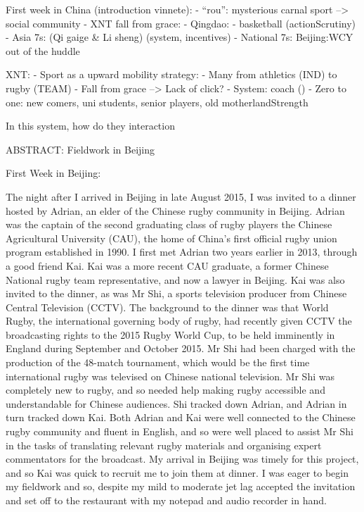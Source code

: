 First week in China (introduction vinnete):
- ``rou'': mysterious carnal sport --> social community
- XNT fall from grace:
- Qingdao:
    - basketball (actionScrutiny)
    - Asia 7s: (Qi gaige & Li sheng) (system, incentives)
    - National 7s: Beijing:WCY out of the huddle


XNT:
- Sport as a upward mobility strategy:
    - Many from athletics (IND) to rugby (TEAM)
- Fall from grace --> Lack of click?
- System: coach ()
- Zero to one: new comers, uni students, senior players, old motherlandStrength

In this system, how do they interaction

ABSTRACT:
Fieldwork in Beijing


First Week in Beijing:

The night after I arrived in Beijing in late August 2015, I was invited to a dinner hosted by Adrian, an elder of the Chinese rugby community in Beijing.  Adrian was the captain of the second graduating class of rugby players the Chinese Agricultural University (CAU), the home of China's first official rugby union program established in 1990.  I first met Adrian two years earlier in 2013, through a good friend Kai. Kai was  a more recent CAU graduate, a former Chinese National rugby team representative, and now a lawyer in Beijing.  Kai was also invited to the dinner, as was Mr Shi, a sports television producer from Chinese Central Television (CCTV).  The background to the dinner was that World Rugby, the international governing body of rugby, had recently given CCTV the broadcasting rights to the 2015 Rugby World Cup, to be held imminently in England during September and October 2015.  Mr Shi had been charged with the production of the 48-match tournament, which would be the first time international rugby was televised on Chinese national television.  Mr Shi was completely new to rugby, and so needed help making rugby accessible and understandable for Chinese audiences.  Shi tracked down Adrian, and Adrian in turn tracked down Kai.  Both Adrian and Kai were
well connected to the Chinese rugby community and fluent in English, and so were well placed to assist Mr Shi in the tasks of translating relevant rugby materials and organising expert commentators for the broadcast. My arrival in Beijing was timely for this project, and so Kai was quick to recruit me to join them at dinner.  I was eager to begin my fieldwork and so, despite my mild to moderate jet lag accepted the invitation and set off to the restaurant with my notepad and audio recorder in hand.

